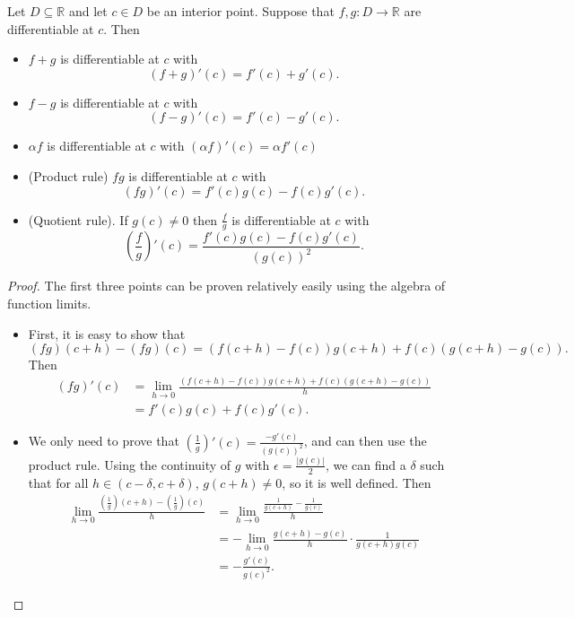 \begin{theorem}
    Let $D \subseteq \mathbb{R}$ and let $c \in D$ be an interior point. Suppose that $f, g : D \rightarrow \mathbb{R}$ are differentiable at $c$. Then
    \begin{itemize}
      \item $f + g$ is differentiable at $c$ with
        \[(f + g)'(c) = f'(c) + g'(c).\]
      \item $f - g$ is differentiable at $c$ with 
        \[(f - g)'(c) = f'(c) - g'(c).\]
      \item $\alpha f$ is differentiable at $c$ with $(\alpha f)'(c) = \alpha f'(c)$
      \item (Product rule) $fg$ is differentiable at $c$ with
        \[(fg)'(c) = f'(c)g(c) - f(c)g'(c).\]
      \item (Quotient rule). If $g(c) \not = 0$ then $\frac{f}{g}$ is differentiable at $c$ with
        \[\left(\frac{f}{g}\right)'(c) = \frac{f'(c)g(c) - f(c)g'(c)}{(g(c))^2}.\]
    \end{itemize}
\end{theorem}
\begin{proof}
    The first three points can be proven relatively easily using the algebra of function limits.
    \begin{itemize}
      \item First, it is easy to show that
        \[(fg)(c + h) - (fg)(c) = \left(f(c + h) - f(c)\right)g(c + h) + f(c)\left(g(c + h) - g(c)\right).\]
        Then
        \begin{align*}
          (fg)'(c) &= \lim_{h \rightarrow 0}\frac{\left(f(c + h) - f(c)\right)g(c + h) + f(c)\left(g(c + h) - g(c)\right)}{h} \\
                   &= f'(c) g(c) + f(c) g'(c)
        .\end{align*}
      \item We only need to prove that $\left( \frac{1}{g}\right)'(c) = \frac{-g'(c)}{(g(c))^2}$, and can then use the product rule. Using the continuity of $g$ with $\epsilon = \frac{|g(c)|}{2}$, we can find a $\delta$ such that for all $h \in (c - \delta, c + \delta)$, $g(c + h) \not = 0$, so it is well defined. Then
        \begin{align*}
          \lim_{h \rightarrow 0} \frac{ ( \frac{1}{g})(c + h) - (\frac{1}{g})(c)}{h} &= \lim_{h \rightarrow 0} \frac{ \frac{1}{g(c +h)} - \frac{1}{g(c)}}{h} \\
           &= - \lim_{h \rightarrow 0} \frac{g(c + h) - g(c)}{h} \cdot \frac{1}{g(c + h) g(c)} \\
           &= - \frac{g'(c)}{g(c)^2}
        .\end{align*}
    \end{itemize}
    
\end{proof}
